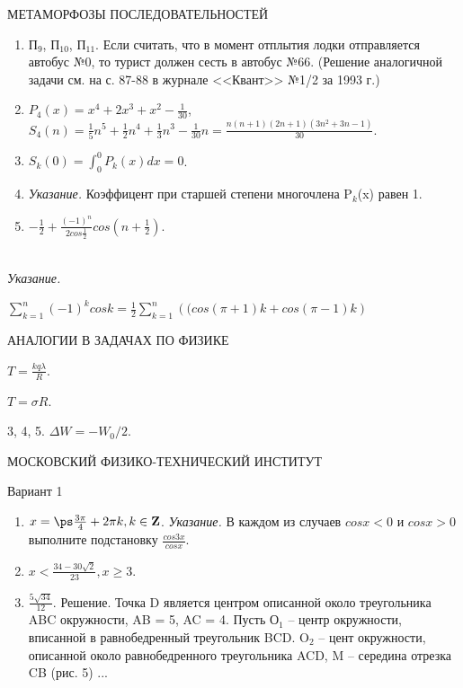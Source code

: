 \medskip

{\textsc{\Large МЕТАМОРФОЗЫ ПОСЛЕДОВАТЕЛЬНОСТЕЙ}}

\begin{enumerate}[itemsep = -3pt, itemindent = -7pt, labelsep = 5pt, font = \bfseries, topsep = 3pt, wide]
\item П$_9$, П$_{10}$, П$_{11}$. Если считать, что в момент отплытия лодки отправляется автобус №0, то турист должен сесть в автобус  №66. (Решение аналогичной задачи см. на с. 87-88 в журнале <<Квант>> №1/2 за 1993 г.)
\item $P_4(x) = x^4 + 2x^3 + x^2 - \frac{1}{30}$,\\
{\small $S_4(n) = \frac{1}{5}n^5 + \frac{1}{2}n^4 + \frac{1}{3}n^3 - \frac{1}{30}n = \frac{n(n+1)(2n + 1)(3n^2+3n -1)}{30}$.}
\item $S_k(0) = \int_{0}^{0}P_k(x)dx = 0$.
\item {\it Указание.} Коэффицент при старшей степени многочлена P$_k$(x) равен 1.\\
\item $-\frac{1}{2} + \frac{(-1)^n}{2cos\frac{1}{2}} cos\left(n  + \frac{1}{2}\right)$.
\end{enumerate}\\
{\it Указание.}

 \qquad $\sum_{k = 1}^{n} (-1)^k cosk = \frac{1}{2}\sum_{k=1}^{n} \left((cos(\pi + 1)k +cos(\pi - 1)k \right)$
 
\medskip
{\textsc{\Large АНАЛОГИИ В ЗАДАЧАХ ПО ФИЗИКЕ}}

\begin{enumerate*} [itemsep = -3pt, itemindent = -7pt, labelsep = 5pt, font = \bfseries, topsep = 3pt]
    \item $T = \frac{kq\lambda}{R}$.\qquad
    \item $T = \sigma R$.
    \item[3, 4, 5.] $\Delta W = - W_0/2$.
\end{enumerate*}

\medskip
{\textsc{\Large МОСКОВСКИЙ ФИЗИКО-ТЕХНИЧЕСКИЙ ИНСТИТУТ}}

{}

Вариант 1

\begin{enumerate}[itemsep = -3pt, itemindent = -7pt, labelsep = 5pt, font = \bfseries, topsep = 3pt, wide]
    \item $x = \ps \frac{3\pi}{4} + 2\pi k, k \in {\bf Z}$. {\it Указание.} В каждом из случаев $cosx < 0$ и $cosx > 0$ выполните подстановку $\frac{cos3x}{cosx}$.
    \item $x < \frac{34 - 30\sqrt{2}}{23}, x \geq 3$.
    \item $\frac{5\sqrt{34}}{12}$. Решение. Точка D является центром описанной около треугольника  ABC окружности, AB = 5, AC = 4. Пусть О$_1$ -- центр окружности, вписанной в равнобедренный треугольник BCD. O$_2$ -- цент окружности, описанной около равнобедренного треугольника ACD, M --  середина отрезка CB (рис. 5) ...
\end{enumerate}
